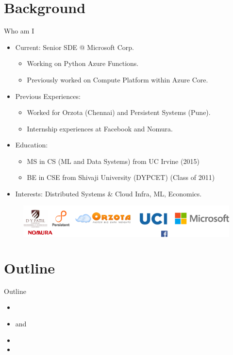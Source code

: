 \documentclass{beamer}
\begin{document}
\section{Background}
\label{sec:Background}
\begin{frame}{Who am I}
\begin{itemize}
    \item Current: Senior SDE @ Microsoft Corp.
    \begin{itemize}
    \item Working on Python Azure Functions.
    \item Previously worked on Compute Platform within Azure Core.
    \end{itemize}
    \item Previous Experiences:
    \begin{itemize}
    \item Worked for Orzota (Chennai) and Persistent Systems (Pune).
    \item Internship experiences at Facebook and Nomura.
    \end{itemize}
    \item Education:
    \begin{itemize}
    \item MS in CS (ML and Data Systems) from UC Irvine (2015)
    \item BE in CSE from Shivaji University (DYPCET) (Class of 2011)
    \end{itemize}
    \item Interests: Distributed Systems \& Cloud Infra, ML, Economics.
\end{itemize}
\begin{figure}
\centering
\captionsetup{justification=centering}
\includegraphics[scale=0.35]{Picture1.png}
\end{figure}
\end{frame}

\section{Outline}
\begin{frame}{Outline}
\begin{itemize}
  \item {}
  \item {} and 
  \item {}
  \item {}
\end{itemize}
\end{frame}
\end{document}
